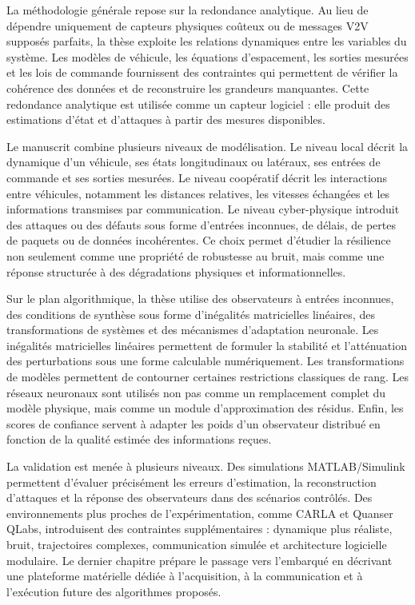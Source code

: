 La méthodologie générale repose sur la redondance analytique. Au lieu de dépendre uniquement de capteurs physiques coûteux ou de messages V2V supposés parfaits, la thèse exploite les relations dynamiques entre les variables du système. Les modèles de véhicule, les équations d'espacement, les sorties mesurées et les lois de commande fournissent des contraintes qui permettent de vérifier la cohérence des données et de reconstruire les grandeurs manquantes. Cette redondance analytique est utilisée comme un capteur logiciel : elle produit des estimations d'état et d'attaques à partir des mesures disponibles.

Le manuscrit combine plusieurs niveaux de modélisation. Le niveau local décrit la dynamique d'un véhicule, ses états longitudinaux ou latéraux, ses entrées de commande et ses sorties mesurées. Le niveau coopératif décrit les interactions entre véhicules, notamment les distances relatives, les vitesses échangées et les informations transmises par communication. Le niveau cyber-physique introduit des attaques ou des défauts sous forme d'entrées inconnues, de délais, de pertes de paquets ou de données incohérentes. Ce choix permet d'étudier la résilience non seulement comme une propriété de robustesse au bruit, mais comme une réponse structurée à des dégradations physiques et informationnelles.

Sur le plan algorithmique, la thèse utilise des observateurs à entrées inconnues, des conditions de synthèse sous forme d'inégalités matricielles linéaires, des transformations de systèmes et des mécanismes d'adaptation neuronale. Les inégalités matricielles linéaires permettent de formuler la stabilité et l'atténuation des perturbations sous une forme calculable numériquement. Les transformations de modèles permettent de contourner certaines restrictions classiques de rang. Les réseaux neuronaux sont utilisés non pas comme un remplacement complet du modèle physique, mais comme un module d'approximation des résidus. Enfin, les scores de confiance servent à adapter les poids d'un observateur distribué en fonction de la qualité estimée des informations reçues.

La validation est menée à plusieurs niveaux. Des simulations MATLAB/Simulink permettent d'évaluer précisément les erreurs d'estimation, la reconstruction d'attaques et la réponse des observateurs dans des scénarios contrôlés. Des environnements plus proches de l'expérimentation, comme CARLA et Quanser QLabs, introduisent des contraintes supplémentaires : dynamique plus réaliste, bruit, trajectoires complexes, communication simulée et architecture logicielle modulaire. Le dernier chapitre prépare le passage vers l'embarqué en décrivant une plateforme matérielle dédiée à l'acquisition, à la communication et à l'exécution future des algorithmes proposés.

